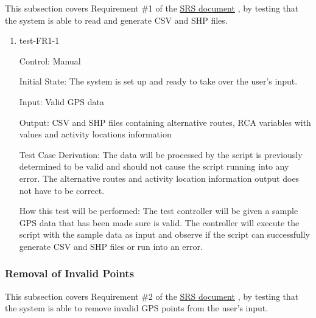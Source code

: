 \documentclass[12pt, titlepage]{article}
\begin{document}
This subsection covers Requirement \#1 of the \href{https://github.com/paezha/PyERT-BLACK/blob/main/docs/SRS/SRS.pdf}{SRS document} \citep{SRS}, by testing that the system is able to read and generate CSV and SHP files.

\begin{enumerate}

\item{test-FR1-1\\} \label{test-FR1-1}

Control: Manual 
					
Initial State: The system is set up and ready to take over the user's input.
					
Input: Valid GPS data
					
Output: CSV and SHP files containing alternative routes, RCA variables with values and activity locations information

Test Case Derivation: The data will be processed by the script is previously determined to be valid and should not cause the script running into any error. The alternative routes and activity location information output does not have to be correct.
					
How this test will be performed: The test controller will be given a sample GPS data that has been made sure is valid. The controller will execute the script with the sample data as input and observe if the script can successfully generate CSV and SHP files or run into an error.  
					
\end{enumerate}

\subsubsection{Removal of Invalid Points}

This subsection covers Requirement \#2 of the \href{https://github.com/paezha/PyERT-BLACK/blob/main/docs/SRS/SRS.pdf}{SRS document} \citep{SRS}, by testing that the system is able to remove invalid GPS points from the user's input. 
\end{document}
